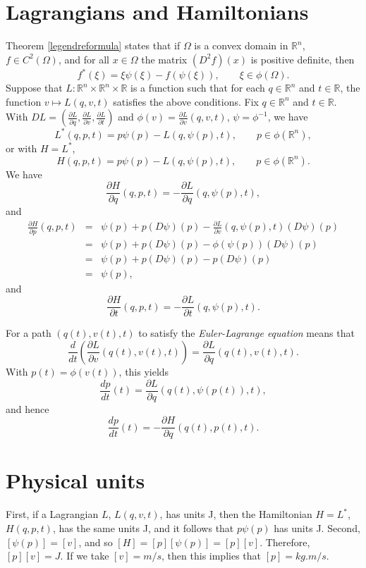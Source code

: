 \documentclass{article}
\theoremstyle{definition}
\begin{document}
\section{Lagrangians and Hamiltonians}
Theorem \ref{legendreformula} states that if 
$\Omega$ is a convex domain in $\mathbb{R}^n$, $f \in C^2(\Omega)$, 
and for all $x \in \Omega$ the matrix $(D^2 f)(x)$ is positive definite, then
\[
f^*(\xi) = \xi  \psi(\xi) -f(\psi(\xi)), \qquad \xi \in \phi(\Omega).
\]
Suppose that $L:\mathbb{R}^n \times \mathbb{R}^n \times \mathbb{R}$ is a function
such that for each $q \in \mathbb{R}^n$ and $t \in \mathbb{R}$, the function $v \mapsto
L(q,v,t)$ satisfies the above conditions. Fix $q \in \mathbb{R}^n$ and $t \in \mathbb{R}$. 
With $DL=(\frac{\partial L}{\partial q},\frac{\partial L}{\partial v},\frac{\partial L}{\partial t})$ and
 $\phi(v) = \frac{\partial L}{\partial v} (q,v,t)$, $\psi=\phi^{-1}$, we have
 \[
 L^*(q,p,t) = p \psi(p)-L(q,\psi(p),t), \qquad p \in \phi(\mathbb{R}^n),
 \]
 or with $H=L^*$,
 \[
 H(q,p,t) = p\psi(p)-L(q,\psi(p),t), \qquad p \in \phi(\mathbb{R}^n).
 \]
We have
\[
\frac{\partial H}{\partial q}(q,p,t) = -\frac{\partial L}{\partial q}(q,\psi(p),t),
\]
and
\begin{eqnarray*}
\frac{\partial H}{\partial p}(q,p,t) &=& \psi(p)+p(D\psi)(p) - \frac{\partial L}{\partial v}(q,\psi(p),t) (D\psi)(p)\\
&=&\psi(p)+p(D\psi)(p)-\phi(\psi(p)) (D\psi)(p)\\
&=&\psi(p)+p(D\psi)(p)-p(D\psi)(p)\\
&=&\psi(p),
\end{eqnarray*}
and
\[
\frac{\partial H}{\partial t}(q,p,t) = -\frac{\partial L}{\partial t}(q,\psi(p),t).
\]

For a path $(q(t),v(t),t)$ to satisfy the
 {\em Euler-Lagrange equation} means that 
\[
\frac{d}{dt}\left( \frac{\partial L}{\partial v} (q(t),v(t),t) \right)  = \frac{\partial L}{\partial q} (q(t),v(t),t).
\]
With $p(t)=\phi(v(t))$, this yields
\[
\frac{dp}{dt}(t) = \frac{\partial L}{\partial q} (q(t),\psi(p(t)),t),
\]
and hence
\[
\frac{dp}{dt}(t) = -\frac{\partial H}{\partial q}(q(t),p(t),t).
\]





\section{Physical units}
First, if a Lagrangian $L$, $L(q,v,t)$, has units \si{J}, then the Hamiltonian $H=L^*$, $H(q,p,t)$, has the same units \si{J}, and it follows
that $p\psi(p)$ has units \si{J}.  Second, $[\psi(p)]=[v]$, and so $[H]=[p][\psi(p)]=[p][v]$. Therefore, $[p][v]=\si{J}$. If we take $[v]=\si{m/s}$, then
this implies that $[p]=\si{kg.m/s}$.
\end{document}
